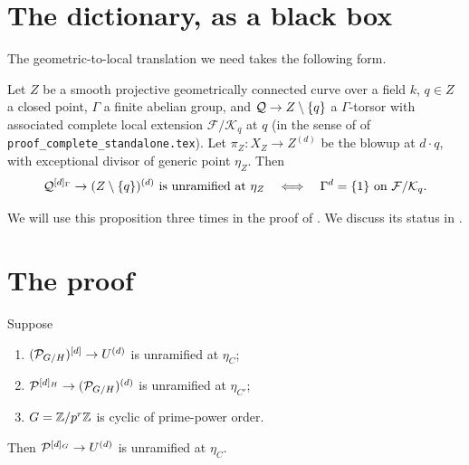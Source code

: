 \documentclass[11pt]{article}
\begin{document}
\section{The dictionary, as a black box}\label{sec:dictionary}

The geometric-to-local translation we need takes the following form.

\begin{proposition}\label{prop:dictionary}
Let $Z$ be a smooth projective geometrically connected curve over a field $k$,
$q \in Z$ a closed point, $\Gamma$ a finite abelian group, and $\mathcal{Q} \to Z
\setminus \{q\}$ a $\Gamma$-torsor with associated complete local extension
$\mathcal{F}/\mathcal{K}_q$ at $q$ (in the sense of
 of
\texttt{proof\_complete\_standalone.tex}). Let $\pi_Z \colon X_Z \to Z^{(d)}$
be the blowup at $d\cdot q$, with exceptional divisor of generic point
$\eta_Z$. Then
\[
\mathcal{Q}^{[d]_\Gamma} \to (Z\setminus\{q\})^{(d)}\text{ is unramified at } \eta_Z
\quad\Longleftrightarrow\quad \Gamma^d = \{1\}\text{ on }
\mathcal{F}/\mathcal{K}_q .
\]
\end{proposition}

We will use this proposition three times in the proof of .
We discuss its status in .

\section{The proof}\label{sec:proof}

\begin{theorem}\label{thm:main-herb}
Suppose
\begin{enumerate}
  \item[\textnormal{(H1)}] $(\mathcal{P}_{G/H})^{[d]} \to U^{(d)}$ is unramified at
        $\eta_C$;
  \item[\textnormal{(H2)}] $\mathcal{P}^{[d]_H} \to (\mathcal{P}_{G/H})^{(d)}$ is unramified at
        $\eta_{C'}$;
  \item[\textnormal{(H3)}] $G = \mathbb{Z}/p^r\mathbb{Z}$ is cyclic of prime-power order.
\end{enumerate}
Then $\mathcal{P}^{[d]_G} \to U^{(d)}$ is unramified at $\eta_C$.
\end{theorem}
\end{document}
